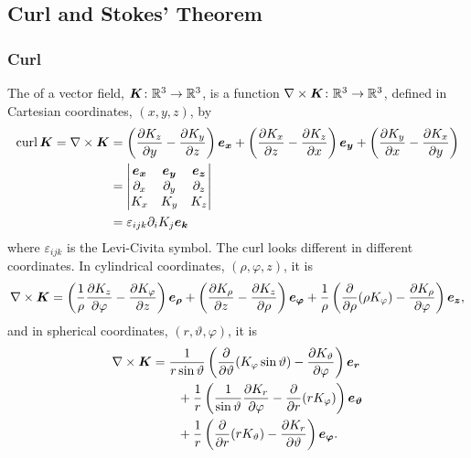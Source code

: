     \subsection{Curl and Stokes' Theorem}
    \subsubsection{Curl}
    The  of a vector field, \(\bm{K}\colon\mathbb{R}^3\to\mathbb{R}^3\), is a function \(\nabla\times\bm{K}\colon\mathbb{R}^3\to\mathbb{R}^3\), defined in Cartesian coordinates, \((x, y, z)\), by
    \begin{align*}
        \operatorname{curl}\bm{K} = \nabla\times \bm{K} &= \left(\pdv{K_z}{y} - \pdv{K_y}{z}\right)\bm{e_{x}} + \left(\pdv{K_x}{z} - \pdv{K_z}{x}\right)\bm{e_{y}} + \left(\pdv{K_y}{x} - \pdv{K_x}{y}\right)\\
        &=
        \begin{vmatrix}
            \bm{e_{x}} & \bm{e_{y}} & \bm{e_{z}}\\
            \partial_x & \partial_y & \partial_z\\
            K_x & K_y & K_z
        \end{vmatrix}
        \\
        &= \varepsilon_{ijk}\partial_i K_j\bm{e_{k}}
    \end{align*}
    where \(\varepsilon_{ijk}\) is the Levi-Civita symbol.
    The curl looks different in different coordinates.
    In cylindrical coordinates, \((\rho, \varphi, z)\), it is
    \[\nabla\times\bm{K} = \left(\frac{1}{\rho}\pdv{K_z}{\varphi} - \pdv{K_\varphi}{z}\right)\bm{e_{\rho}} + \left(\pdv{K_\rho}{z} - \pdv{K_z}{\rho}\right)\bm{e_{\varphi}} + \frac{1}{\rho}\left(\pdv{\rho}(\rho K_\varphi) - \pdv{K_\rho}{\varphi}\right)\bm{e_{z}},\]
    and in spherical coordinates, \((r, \vartheta, \varphi)\), it is
    \begin{align*}
        \nabla\times\bm{K} &= \frac{1}{r\sin\vartheta}\left(\pdv{\vartheta}(K_\varphi\sin\vartheta) - \pdv{K_\vartheta}{\varphi}\right)\bm{e_{r}}\\
        &\qquad+ \frac{1}{r}\left(\frac{1}{\sin\vartheta}\pdv{K_r}{\varphi} - \pdv{r}(rK_\varphi)\right)\bm{e_{\vartheta}} \\
        &\qquad+ \frac{1}{r}\left(\pdv{r}(rK_\vartheta) - \pdv{K_r}{\vartheta}\right)\bm{e_{\varphi}}.
    \end{align*}
    
